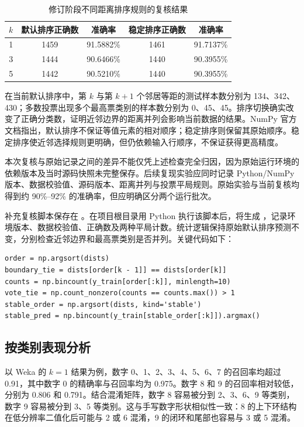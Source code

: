 \documentclass[UTF8,zihao=-4]{ctexart}
\begin{document}
\begin{table}[H]
  \centering
  \caption{修订阶段不同距离排序规则的复核结果}
  \label{tab:sort-audit}
  \begin{tabular}{ccccc}
    \toprule
    $k$ & 默认排序正确数 & 准确率 & 稳定排序正确数 & 准确率 \\
    \midrule
    1 & 1459 & 91.5882\% & 1461 & 91.7137\% \\
    3 & 1444 & 90.6466\% & 1440 & 90.3955\% \\
    5 & 1442 & 90.5210\% & 1440 & 90.3955\% \\
    \bottomrule
  \end{tabular}
\end{table}

在当前默认排序中，第 $k$ 与第 $k+1$ 个邻居等距的测试样本数分别为 134、342、430；多数投票出现多个最高票类别的样本数分别为 0、45、45。排序切换确实改变了正确分类数，证明近邻边界的距离并列会影响当前数据的结果。NumPy 官方文档指出，默认排序不保证等值元素的相对顺序；稳定排序则保留其原始顺序。稳定排序使近邻选择规则更明确，但仍依赖输入行顺序，不保证获得更高精度。

本次复核与原始记录之间的差异不能仅凭上述检查完全归因，因为原始运行环境的依赖版本及当时源码快照未完整保存。后续复现实验应同时记录 Python/NumPy 版本、数据校验值、源码版本、距离并列与投票平局规则。原始实验与当前复核均得到约 90\%--92\% 的准确率，但应明确区分两个运行批次。

补充复核脚本保存在 。在项目根目录用 Python 执行该脚本后，将生成 ，记录环境版本、数据校验值、正确数及两种平局计数。统计逻辑保持原始默认排序预测不变，分别检查近邻边界和最高票类别是否并列。关键代码如下：
\begin{lstlisting}[style=pythonstyle,caption={等距离边界与投票平局的检查方法}]
order = np.argsort(dists)
boundary_tie = dists[order[k - 1]] == dists[order[k]]
counts = np.bincount(y_train[order[:k]], minlength=10)
vote_tie = np.count_nonzero(counts == counts.max()) > 1
stable_order = np.argsort(dists, kind='stable')
stable_pred = np.bincount(y_train[stable_order[:k]]).argmax()
\end{lstlisting}

\subsection{按类别表现分析}

以 Weka 的 $k=1$ 结果为例，数字 0、1、2、3、4、5、6、7 的召回率均超过 0.91，其中数字 0 的精确率与召回率均为 0.975。数字 8 和 9 的召回率相对较低，分别为 0.806 和 0.791。结合混淆矩阵，数字 8 容易被分到 2、3、6、9 等类别，数字 9 容易被分到 3、5 等类别。这与手写数字形状相似性一致：8 的上下环结构在低分辨率二值化后可能与 2 或 6 混淆，9 的闭环和尾部也容易与 3 或 5 混淆。
\end{document}
